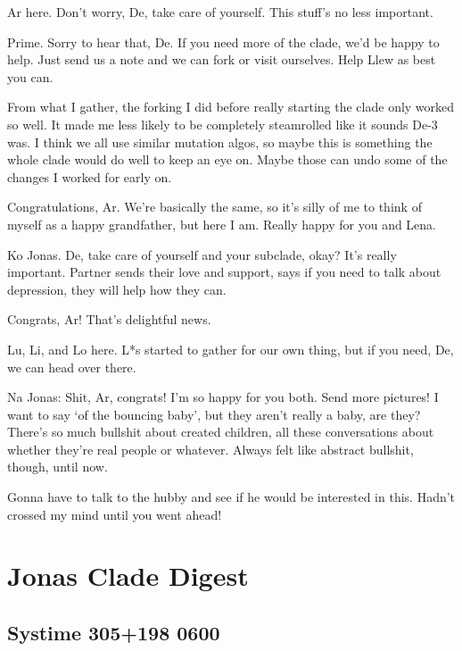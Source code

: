 Ar here. Don't worry, De, take care of yourself. This stuff's no less important.

\secdiv{}

\noindent Prime. Sorry to hear that, De. If you need more of the clade, we'd be happy to help. Just send us a note and we can fork or visit ourselves. Help Llew as best you can.

From what I gather, the forking I did before really starting the clade only worked so well. It made me less likely to be completely steamrolled like it sounds De-3 was. I think we all use similar mutation algos, so maybe this is something the whole clade would do well to keep an eye on. Maybe those can undo some of the changes I worked for early on.

Congratulations, Ar. We're basically the same, so it's silly of me to think of myself as a happy grandfather, but here I am. Really happy for you and Lena.

\secdiv{}

\noindent Ko Jonas. De, take care of yourself and your subclade, okay? It's really important. Partner sends their love and support, says if you need to talk about depression, they will help how they can.

Congrats, Ar! That's delightful news.

\secdiv{}

\noindent Lu, Li, and Lo here. L*s started to gather for our own thing, but if you need, De, we can head over there.

\secdiv{}

\noindent Na Jonas: Shit, Ar, congrats! I'm so happy for you both. Send more pictures! I want to say `of the bouncing baby', but they aren't really a baby, are they? There's so much bullshit about created children, all these conversations about whether they're real people or whatever. Always felt like abstract bullshit, though, until now.

Gonna have to talk to the hubby and see if he would be interested in this. Hadn't crossed my mind until you went ahead!

\newpage
\hypertarget{jonas-clade-digest-3}{%
\section*{Jonas Clade Digest}\label{jonas-clade-digest-3}}

\hypertarget{systime-305198-0600}{%
\subsection*{Systime 305+198 0600}\label{systime-305198-0600}}

